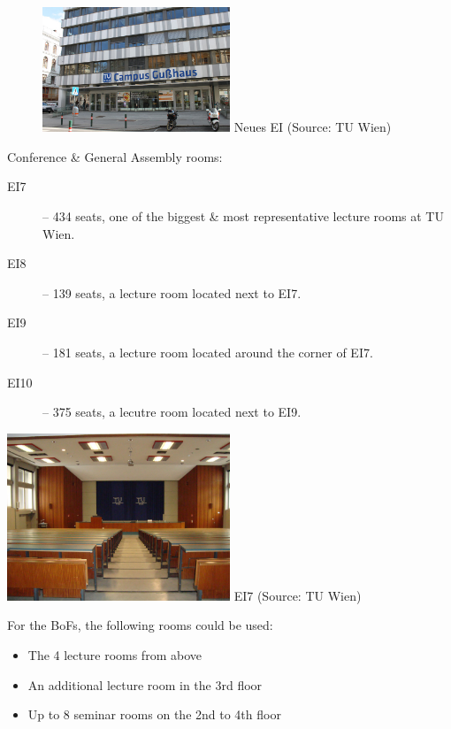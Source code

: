\documentclass[10pt,a4paper]{article}
\begin{document}
\begin{figure}
\vspace{-22pt}
\begin{center}
\includegraphics[width=0.5\textwidth]{neues_ei_tuwien.jpg}
\footnotesize{Neues EI (Source: TU Wien)}
\end{center}
\vspace{-16pt}
\end{figure}

Conference \& General Assembly rooms:
\begin{description}
\item[\color{kdedarker} EI7] -- 434 seats, one of the biggest \& most representative lecture rooms at TU Wien.
\item[\color{kdedarker} EI8] -- 139 seats, a lecture room located next to EI7.
\item[\color{kdedarker} EI9] -- 181 seats, a lecture room located around the corner of EI7.
\item[\color{kdedarker} EI10]-- 375 seats, a lecutre room located next to EI9.
\end{description}

\vspace{10pt}
\begin{center}
	\includegraphics[width=0.5\textwidth]{EI7_tuwien.jpg}
	\footnotesize{EI7 (Source: TU Wien)}
\end{center}
\vspace{10pt}

For the BoFs, the following rooms could be used:\\
\begin{itemize}
	\item The 4 lecture rooms from above
	\item An additional lecture room in the 3rd floor
	\item Up to 8 seminar rooms on the 2nd to 4th floor
\end{itemize}
\end{document}
